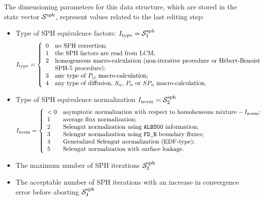 The dimensioning parameters for this data structure, which are stored in the state vector
$\mathcal{S}^{\rm sph}$, represent values related to the last editing step:

\begin{itemize}

\item Type of SPH equivalence factors: 
      $I_{\rm type}=\mathcal{S}^{\rm sph}_{1}$
\begin{displaymath}
I_{\rm type} = \left\{
\begin{array}{ll}
0 & \textrm{no SPH correction;} \\
1 & \textrm{the SPH factors are read from LCM;} \\
2 & \textrm{homogeneous macro-calculation (non-iterative procedure or H\'ebert-Benoist} \\
   & \textrm{SPH-5 procedure);} \\
3 & \textrm{any type of $P_{ij}$ macro-calculation;} \\
4 & \textrm{any type of diffusion, $S_n$, $P_n$ or $SP_n$ macro-calculation.}
\end{array} \right.
\end{displaymath}
    
\item Type of SPH equivalence normalization $I_{\rm norm}=\mathcal{S}^{\rm sph}_{2}$
\begin{displaymath}
I_{\rm norm} = \left\{
\begin{array}{ll}
<0 & \textrm{asymptotic normalization with respect to homoheneous mixture} -I_{\rm norm}; \\
1 & \textrm{average flux normalization;} \\
2 & \textrm{Selengut normalization using {\tt ALBS00} information;} \\
3 & \textrm{Selengut normalization using {\tt FD\_B} boundary fluxes;} \\
4 & \textrm{Generalized Selengut normalization (EDF-type);} \\
5 & \textrm{Selengut normalization with surface leakage.}
\end{array} \right.
\end{displaymath}

\item The maximum number of SPH iterations $\mathcal{S}^{\rm sph}_{3}$ 

\item The acceptable number of SPH iterations with an increase in convergence error before aborting $\mathcal{S}^{\rm sph}_{4}$


\end{itemize}
